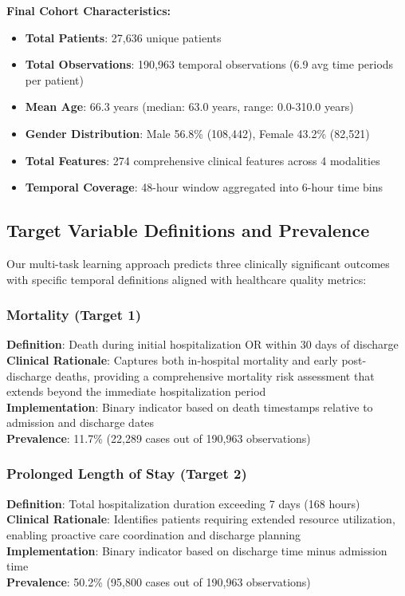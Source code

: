 \documentclass[11pt]{article}
\begin{document}
\textbf{Final Cohort Characteristics:}
\begin{itemize}
    \item \textbf{Total Patients}: 27,636 unique patients
    \item \textbf{Total Observations}: 190,963 temporal observations (6.9 avg time periods per patient)
    \item \textbf{Mean Age}: 66.3 years (median: 63.0 years, range: 0.0-310.0 years)
    \item \textbf{Gender Distribution}: Male 56.8\% (108,442), Female 43.2\% (82,521)
    \item \textbf{Total Features}: 274 comprehensive clinical features across 4 modalities
    \item \textbf{Temporal Coverage}: 48-hour window aggregated into 6-hour time bins
\end{itemize}

\subsection{Target Variable Definitions and Prevalence}

Our multi-task learning approach predicts three clinically significant outcomes with specific temporal definitions aligned with healthcare quality metrics:

\subsubsection{Mortality (Target 1)}
\textbf{Definition}: Death during initial hospitalization OR within 30 days of discharge
\\
\textbf{Clinical Rationale}: Captures both in-hospital mortality and early post-discharge deaths, providing a comprehensive mortality risk assessment that extends beyond the immediate hospitalization period
\\
\textbf{Implementation}: Binary indicator based on death timestamps relative to admission and discharge dates
\\
\textbf{Prevalence}: 11.7\% (22,289 cases out of 190,963 observations)

\subsubsection{Prolonged Length of Stay (Target 2)}
\textbf{Definition}: Total hospitalization duration exceeding 7 days (168 hours)
\\
\textbf{Clinical Rationale}: Identifies patients requiring extended resource utilization, enabling proactive care coordination and discharge planning
\\
\textbf{Implementation}: Binary indicator based on discharge time minus admission time
\\
\textbf{Prevalence}: 50.2\% (95,800 cases out of 190,963 observations)
\end{document}
